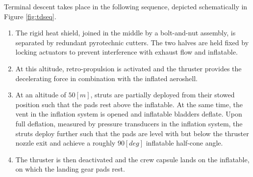 Terminal descent takes place in the following sequence, depicted schematically in Figure \ref{fig:tdseq}.
\begin{enumerate}
\item The rigid heat shield, joined in the middle by a bolt-and-nut assembly, is separated by redundant pyrotechnic cutters. The two halves are held fixed by locking actuators to prevent interference with exhaust flow and inflatable.
\item At this altitude, retro-propulsion is activated and the thruster provides the decelerating force in combination with the inflated aeroshell.
\item At an altitude of $50 \left[m\right]$, struts are partially deployed from their stowed position such that the pads rest above the inflatable. At the same time, the vent in the inflation system is opened and inflatable bladders deflate. Upon full deflation, measured by pressure transducers in the inflation system, the struts deploy further such that the pads are level with but below the thruster nozzle exit and achieve a roughly $90 \left[deg\right]$ inflatable half-cone angle.
\item The thruster is then deactivated and the crew capsule lands on the inflatable, on which the landing gear pads rest.
\end{enumerate}
